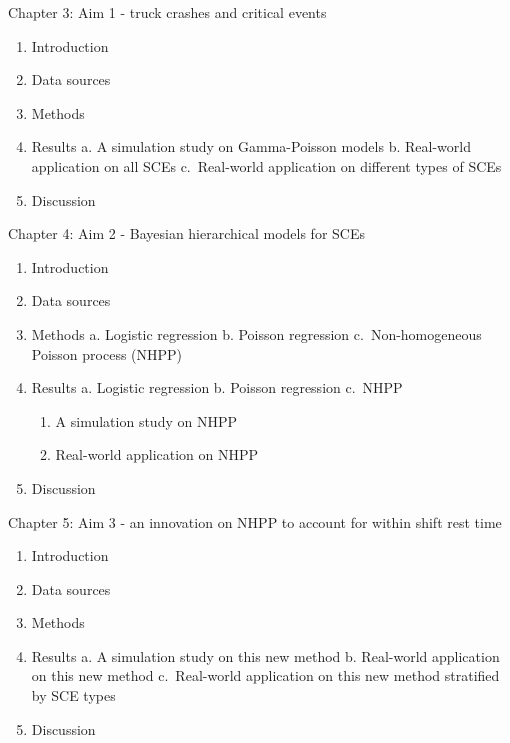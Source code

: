 \documentclass[12pt]{book}
\numberwithin{equation}{chapter}
\providecommand{\tightlist}{%
  \setlength{\itemsep}{0pt}\setlength{\parskip}{0pt}}
\begin{document}
Chapter 3: Aim 1 - truck crashes and critical events

\begin{enumerate}
\def\labelenumi{\arabic{enumi}.}
\tightlist
\item
  Introduction
\item
  Data sources
\item
  Methods
\item
  Results
  a. A simulation study on Gamma-Poisson models
  b. Real-world application on all SCEs
  c.~Real-world application on different types of SCEs
\item
  Discussion
\end{enumerate}

Chapter 4: Aim 2 - Bayesian hierarchical models for SCEs

\begin{enumerate}
\def\labelenumi{\arabic{enumi}.}
\tightlist
\item
  Introduction
\item
  Data sources
\item
  Methods
  a. Logistic regression
  b. Poisson regression
  c.~Non-homogeneous Poisson process (NHPP)
\item
  Results
  a. Logistic regression
  b. Poisson regression
  c.~NHPP

  \begin{enumerate}
  \def\labelenumii{\roman{enumii}.}
  \tightlist
  \item
    A simulation study on NHPP
  \item
    Real-world application on NHPP
  \end{enumerate}
\item
  Discussion
\end{enumerate}

Chapter 5: Aim 3 - an innovation on NHPP to account for within shift rest time

\begin{enumerate}
\def\labelenumi{\arabic{enumi}.}
\tightlist
\item
  Introduction
\item
  Data sources
\item
  Methods
\item
  Results
  a. A simulation study on this new method
  b. Real-world application on this new method
  c.~Real-world application on this new method stratified by SCE types
\item
  Discussion
\end{enumerate}
\end{document}

